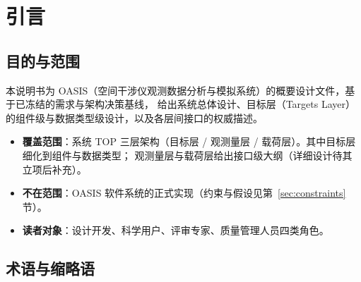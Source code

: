 \section{引言}

\subsection{目的与范围}

本说明书为 OASIS（空间干涉仪观测数据分析与模拟系统）的概要设计文件，基于已冻结的需求与架构决策基线，
给出系统总体设计、目标层（Targets Layer）的组件级与数据类型级设计，以及各层间接口的权威描述。

\begin{itemize}
  \item \textbf{覆盖范围}：系统 TOP 三层架构（目标层 / 观测量层 / 载荷层）。其中目标层细化到组件与数据类型；
        观测量层与载荷层给出接口级大纲（详细设计待其立项后补充）。
  \item \textbf{不在范围}：OASIS 软件系统的正式实现（约束与假设见第~\ref{sec:constraints} 节）。
  \item \textbf{读者对象}：设计开发、科学用户、评审专家、质量管理人员四类角色。
\end{itemize}

\subsection{术语与缩略语}


